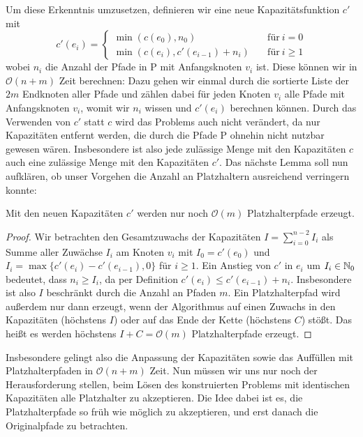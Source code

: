 Um diese Erkenntnis umzusetzen, definieren wir eine neue Kapazitätsfunktion $c'$ mit
\[
	c'(e_i) =
	\begin{cases}
		\min(c(e_0), n_0) &\quad\text{für}\ i=0\\
		\min(c(e_i), c'(e_{i-1}) + n_i) &\quad\text{für}\ i \geq 1
	\end{cases}
\]
wobei $n_i$ die Anzahl der Pfade in P mit Anfangsknoten $v_i$ ist.
Diese können wir in $\mathcal O(n+m)$ Zeit berechnen: Dazu gehen wir einmal durch die sortierte Liste der $2m$ Endknoten
aller Pfade und zählen dabei für jeden Knoten $v_i$ alle Pfade mit Anfangsknoten $v_i$, womit wir $n_i$ wissen und
$c'(e_i)$ berechnen können.
Durch das Verwenden von $c'$ statt $c$ wird das Problems auch nicht verändert, da nur Kapazitäten entfernt
werden, die durch die Pfade P ohnehin nicht nutzbar gewesen wären.
Insbesondere ist also jede zulässige Menge mit den Kapazitäten $c$ auch eine zulässige Menge mit den Kapazitäten $c'$.
Das nächste Lemma soll nun aufklären, ob unser Vorgehen die Anzahl an Platzhaltern ausreichend verringern konnte:

\begin{lemma}
    Mit den neuen Kapazitäten $c'$ werden nur noch $\mathcal O(m)$ Platzhalterpfade erzeugt.
\end{lemma}
\begin{proof}
    Wir betrachten den Gesamtzuwachs der Kapazitäten $I = \sum_{i = 0}^{n-2} I_i$ als Summe aller Zuwächse $I_i$ am
    Knoten $v_i$ mit $I_0 = c'(e_0)$ und $I_i = \max\{c'(e_i) - c'(e_{i-1}), 0\}$ für $i \geq 1$.
    Ein Anstieg von $c'$ in $e_i$ um $I_i \in \mathbb N_0$ bedeutet, dass $n_i \geq I_i$, da per Definition
    $c'(e_i) \leq c'(e_{i-1}) + n_i$.
    Insbesondere ist also $I$ beschränkt durch die Anzahl an Pfaden $m$.
    Ein Platzhalterpfad wird außerdem nur dann erzeugt, wenn der Algorithmus auf einen Zuwachs in den Kapazitäten (höchstens $I$)
    oder auf das Ende der Kette (höchstens $C$) stößt.
    Das heißt es werden höchstens $I + C = \mathcal O(m)$ Platzhalterpfade erzeugt.
\end{proof}

Insbesondere gelingt also die Anpassung der Kapazitäten sowie das Auffüllen mit Platzhalterpfaden in $\mathcal O(n+m)$ Zeit.
Nun müssen wir uns nur noch der Herausforderung stellen, beim Lösen des konstruierten Problems mit identischen Kapazitäten alle
Platzhalter zu akzeptieren.
Die Idee dabei ist es, die Platzhalterpfade so früh wie möglich zu akzeptieren, und erst danach die Originalpfade zu
betrachten.

